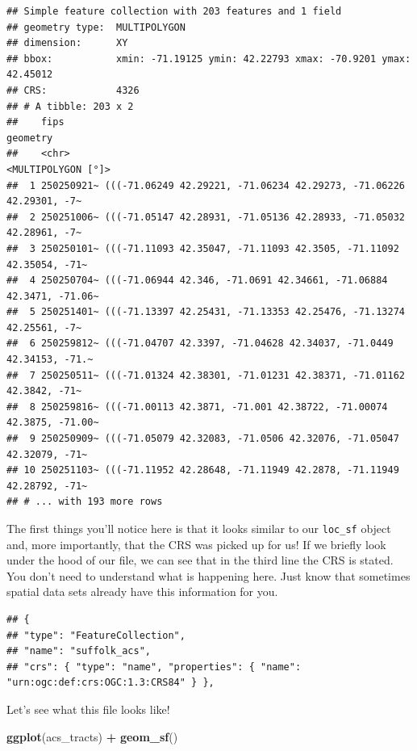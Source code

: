 \documentclass[
]{book}
\newenvironment{Shaded}{\begin{snugshade}}{\end{snugshade}}
\newcommand{\KeywordTok}[1]{\textcolor[rgb]{0.13,0.29,0.53}{\textbf{#1}}}
\newcommand{\NormalTok}[1]{#1}
\newcommand{\OperatorTok}[1]{\textcolor[rgb]{0.81,0.36,0.00}{\textbf{#1}}}
\newcommand{\StringTok}[1]{\textcolor[rgb]{0.31,0.60,0.02}{#1}}
\begin{document}
\begin{verbatim}
## Simple feature collection with 203 features and 1 field
## geometry type:  MULTIPOLYGON
## dimension:      XY
## bbox:           xmin: -71.19125 ymin: 42.22793 xmax: -70.9201 ymax: 42.45012
## CRS:            4326
## # A tibble: 203 x 2
##    fips                                                                 geometry
##    <chr>                                                      <MULTIPOLYGON [°]>
##  1 250250921~ (((-71.06249 42.29221, -71.06234 42.29273, -71.06226 42.29301, -7~
##  2 250251006~ (((-71.05147 42.28931, -71.05136 42.28933, -71.05032 42.28961, -7~
##  3 250250101~ (((-71.11093 42.35047, -71.11093 42.3505, -71.11092 42.35054, -71~
##  4 250250704~ (((-71.06944 42.346, -71.0691 42.34661, -71.06884 42.3471, -71.06~
##  5 250251401~ (((-71.13397 42.25431, -71.13353 42.25476, -71.13274 42.25561, -7~
##  6 250259812~ (((-71.04707 42.3397, -71.04628 42.34037, -71.0449 42.34153, -71.~
##  7 250250511~ (((-71.01324 42.38301, -71.01231 42.38371, -71.01162 42.3842, -71~
##  8 250259816~ (((-71.00113 42.3871, -71.001 42.38722, -71.00074 42.3875, -71.00~
##  9 250250909~ (((-71.05079 42.32083, -71.0506 42.32076, -71.05047 42.32079, -71~
## 10 250251103~ (((-71.11952 42.28648, -71.11949 42.2878, -71.11949 42.28792, -71~
## # ... with 193 more rows
\end{verbatim}

The first things you'll notice here is that it looks similar to our \texttt{loc\_sf} object and, more importantly, that the CRS was picked up for us! If we briefly look under the hood of our file, we can see that in the third line the CRS is stated. You don't need to understand what is happening here. Just know that sometimes spatial data sets already have this information for you.

\begin{verbatim}
## {
## "type": "FeatureCollection",
## "name": "suffolk_acs",
## "crs": { "type": "name", "properties": { "name": "urn:ogc:def:crs:OGC:1.3:CRS84" } },
\end{verbatim}

Let's see what this file looks like!

\begin{Shaded}
\begin{Highlighting}[]
  \KeywordTok{ggplot}\NormalTok{(acs\_tracts) }\OperatorTok{+}
\StringTok{  }\KeywordTok{geom\_sf}\NormalTok{()}
\end{Highlighting}
\end{Shaded}
\end{document}
